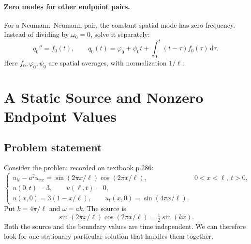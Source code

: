 \documentclass[11pt,a4paper]{article}
\newcommand{\dd}{\,\mathrm{d}}
\begin{document}
\paragraph{Zero modes for other endpoint pairs.}
For a Neumann--Neumann pair, the constant spatial mode has zero frequency.
Instead of dividing by $\omega_0=0$, solve it separately:
\begin{equation}
 q_0''=f_0(t),\qquad
 q_0(t)=\varphi_0+\psi_0t+\int_0^t(t-\tau)f_0(\tau)\dd\tau.
\end{equation}
Here $f_0,\varphi_0,\psi_0$ are spatial averages, with normalization $1/\ell$.

\section{A Static Source and Nonzero Endpoint Values}
\subsection{Problem statement}
Consider the problem recorded on textbook p.286:
\begin{equation}\label{eq:example}
 \begin{cases}
 u_{tt}-a^2u_{xx}=\sin(2\pi x/\ell)\cos(2\pi x/\ell),&0<x<\ell,\ t>0,\\
 u(0,t)=3,\qquad u(\ell,t)=0,\\
 u(x,0)=3(1-x/\ell),\qquad u_t(x,0)=\sin(4\pi x/\ell).
 \end{cases}
\end{equation}
Put $k=4\pi/\ell$ and $\omega=ak$. The source is
\begin{equation}
 \sin(2\pi x/\ell)\cos(2\pi x/\ell)=\tfrac12\sin(kx).
\end{equation}
Both the source and the boundary values are time independent. We can therefore
look for one stationary particular solution that handles them together.
\end{document}
